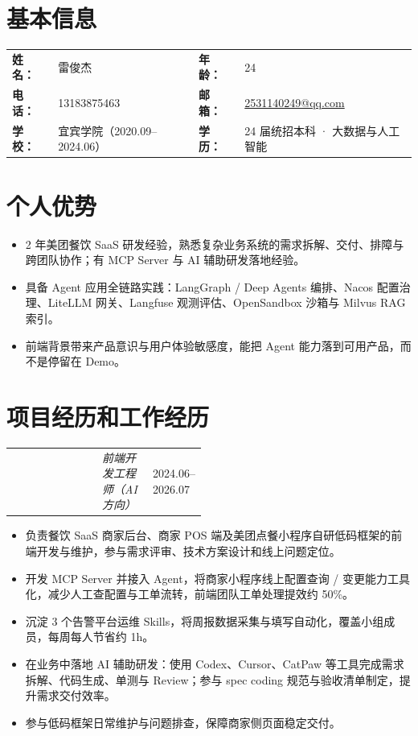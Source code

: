 \documentclass{resume-photo}
\makeatletter
\renewcommand{\heiti}{\bfseries}
\newcommand{\ResumeItemRow}[3]{%
  \par\noindent
  \begin{tabularx}{\linewidth}{@{} >{\raggedright\arraybackslash}X >{\centering\arraybackslash}p{0.26\linewidth} >{\raggedleft\arraybackslash}p{0.22\linewidth} @{}}
    {\heiti #1} & {\textit{#2}} & {#3} \\
  \end{tabularx}
  \par\vspace{1pt}%
}
\makeatother
\begin{document}
\section{基本信息}

\noindent
\begin{tabularx}{\linewidth}{@{} l X l X @{}}
    \textbf{姓 名：} & 雷俊杰 & \textbf{年 龄：} & 24 \\
    \textbf{电 话：} & 13183875463 & \textbf{邮 箱：} & \href{mailto:2531140249@qq.com}{2531140249@qq.com} \\
    \textbf{学 校：} & 宜宾学院（2020.09--2024.06） & \textbf{学 历：} & 24 届统招本科 · 大数据与人工智能 \\
\end{tabularx}

\vspace{1pt}

\section{个人优势}
\begin{itemize}
  \item 2 年美团餐饮 SaaS 研发经验，熟悉复杂业务系统的需求拆解、交付、排障与跨团队协作；有 MCP Server 与 AI 辅助研发落地经验。
  \item 具备 Agent 应用全链路实践：LangGraph / Deep Agents 编排、Nacos 配置治理、LiteLLM 网关、Langfuse 观测评估、OpenSandbox 沙箱与 Milvus RAG 索引。
  \item 前端背景带来产品意识与用户体验敏感度，能把 Agent 能力落到可用产品，而不是停留在 Demo。
\end{itemize}

\section{项目经历和工作经历}

\ResumeItemRow{美团｜营销 SaaS}{前端开发工程师（AI 方向）}{2024.06--2026.07}
\begin{itemize}
  \item 负责餐饮 SaaS 商家后台、商家 POS 端及美团点餐小程序自研低码框架的前端开发与维护，参与需求评审、技术方案设计和线上问题定位。
  \item 开发 MCP Server 并接入 Agent，将商家小程序线上配置查询 / 变更能力工具化，减少人工查配置与工单流转，前端团队工单处理提效约 50\%。
  \item 沉淀 3 个告警平台运维 Skills，将周报数据采集与填写自动化，覆盖小组成员，每周每人节省约 1h。
  \item 在业务中落地 AI 辅助研发：使用 Codex、Cursor、CatPaw 等工具完成需求拆解、代码生成、单测与 Review；参与 spec coding 规范与验收清单制定，提升需求交付效率。
  \item 参与低码框架日常维护与问题排查，保障商家侧页面稳定交付。
\end{itemize}
\end{document}
